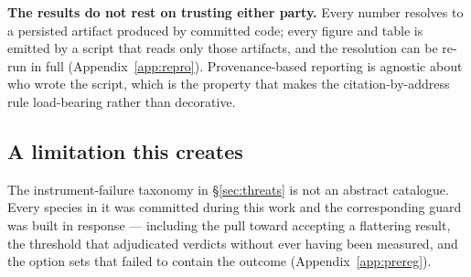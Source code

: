 \textbf{The results do not rest on trusting either party.} Every number resolves to a persisted
artifact produced by committed code; every figure and table is emitted by a script that reads only
those artifacts, and the resolution can be re-run in full
(Appendix~\ref{app:repro}). Provenance-based reporting is agnostic about who wrote the script, which
is the property that makes the citation-by-address rule load-bearing rather than decorative.

\subsection*{A limitation this creates}

The instrument-failure taxonomy in \S\ref{sec:threats} is not an abstract catalogue. Every species in
it was committed during this work and the corresponding guard was built in response --- including
the pull toward accepting a flattering result, the threshold that adjudicated verdicts without ever
having been measured, and the option sets that failed to contain the outcome
(Appendix~\ref{app:prereg}).

